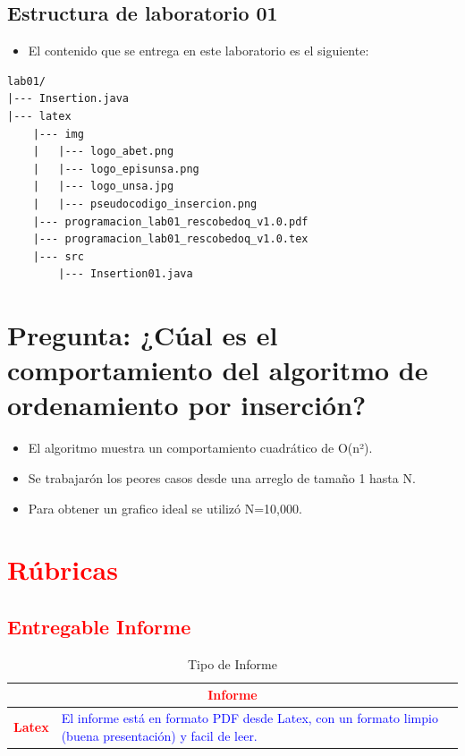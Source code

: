 \documentclass{article}
\begin{document}
		
	\subsection{Estructura de laboratorio 01}
	\begin{itemize}	
		\item El contenido que se entrega en este laboratorio es el siguiente:
	\end{itemize}
	
\begin{lstlisting}[style=ascii-tree]
lab01/
|--- Insertion.java
|--- latex
    |--- img
    |   |--- logo_abet.png
    |   |--- logo_episunsa.png
    |   |--- logo_unsa.jpg
    |   |--- pseudocodigo_insercion.png    
    |--- programacion_lab01_rescobedoq_v1.0.pdf    
    |--- programacion_lab01_rescobedoq_v1.0.tex
    |--- src
        |--- Insertion01.java
\end{lstlisting}    

\section{Pregunta: ¿Cúal es el comportamiento del algoritmo de ordenamiento por inserción?}
	\begin{itemize}
		\item El algoritmo muestra un comportamiento cuadrático de O(n²).
		\item Se trabajarón los peores casos desde una arreglo de tamaño 1 hasta N.
		\item Para obtener un grafico ideal se utilizó N=10,000.
	\end{itemize}		

	\section{\textcolor{red}{Rúbricas}}
	
	\subsection{\textcolor{red}{Entregable Informe}}
	\begin{table}[H]
		\caption{Tipo de Informe}
		\setlength{\tabcolsep}{0.5em} %
		{\renewcommand{\arraystretch}{1.5}%
		\begin{tabular}{|p{3cm}|p{12cm}|}
			\hline
			\multicolumn{2}{|c|}{\textbf{\textcolor{red}{Informe}}}  \\
			\hline 
			\textbf{\textcolor{red}{Latex}} & \textcolor{blue}{El informe está en formato PDF desde Latex,  con un formato limpio (buena presentación) y facil de leer.}   \\ 
			\hline 
			
			
		\end{tabular}
	}
	\end{table}
	
\end{document}
